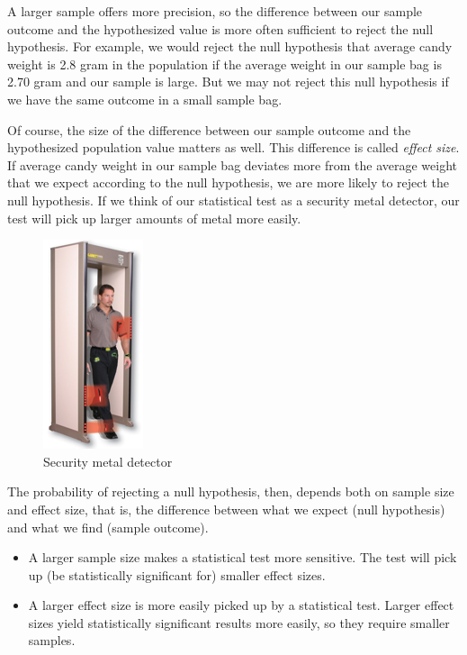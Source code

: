 \documentclass[a4paper]{book}
\theoremstyle{definition}
\theoremstyle{definition}
\theoremstyle{definition}
\theoremstyle{remark}
\begin{document}
A larger sample offers more precision, so the difference between our
sample outcome and the hypothesized value is more often sufficient to
reject the null hypothesis. For example, we would reject the null
hypothesis that average candy weight is 2.8 gram in the population if
the average weight in our sample bag is 2.70 gram and our sample is
large. But we may not reject this null hypothesis if we have the same
outcome in a small sample bag.

Of course, the size of the difference between our sample outcome and the
hypothesized population value matters as well. This difference is called
\emph{effect size}. If average candy weight in our sample bag deviates
more from the average weight that we expect according to the null
hypothesis, we are more likely to reject the null hypothesis. If we
think of our statistical test as a security metal detector, our test
will pick up larger amounts of metal more easily.

\begin{figure}[H]
\centering
\includegraphics{figures/metaldetector.png}
\caption{Security metal detector}
\end{figure}

The probability of rejecting a null hypothesis, then, depends both on
sample size and effect size, that is, the difference between what we
expect (null hypothesis) and what we find (sample outcome).

\begin{itemize}
\item
  A larger sample size makes a statistical test more sensitive. The test
  will pick up (be statistically significant for) smaller effect sizes.
\item
  A larger effect size is more easily picked up by a statistical test.
  Larger effect sizes yield statistically significant results more
  easily, so they require smaller samples.
\end{itemize}
\end{document}
